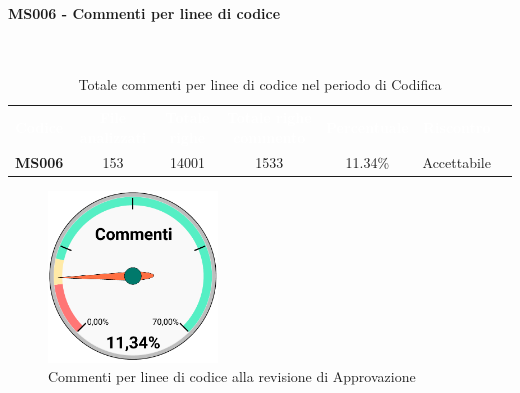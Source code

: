 \paragraph{MS006 - Commenti per linee di codice}\mbox{}\\[0,3cm]
    \begin{table}[H]
        \centering
        \begin{tabular}{ccccccc}
            \rowcolor{greySWEight}
            \textcolor{white}{\textbf{Codice}} &
            \textcolor{white}{\textbf{File analizzati}}&
            \textcolor{white}{\textbf{Totale righe}}&
            \textcolor{white}{\textbf{Totale righe commento}}&
            \textcolor{white}{\textbf{Percentuale}}&
            \textcolor{white}{\textbf{Riscontro}}\\
            \textbf{MS006} & 153 & 14001 & 1533 & 11.34\% & \textcolor{YellowOrange}{Accettabile}\\
        \end{tabular}
        \caption{Totale commenti per linee di codice nel periodo di Codifica}
    \end{table}
    \begin{figure}[H]
        \centering
        \includegraphics[width=45mm]{sez/App_Esito/Approvazione/graph/commenti.pdf}
        \caption{Commenti per linee di codice alla revisione di Approvazione}
    \end{figure}
    


